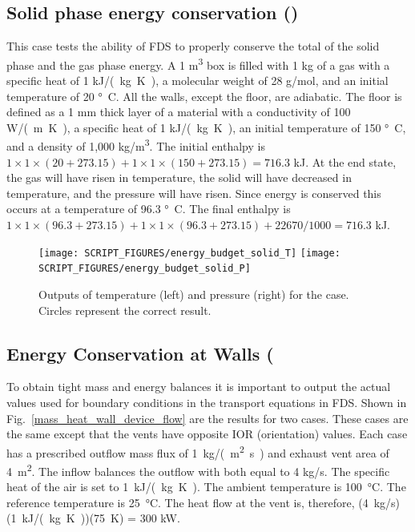 \documentclass[11pt]{book}
\begin{document}
\subsection{Solid phase energy conservation (\texorpdfstring{}{energy\_budget\_solid})}
\label{energy_budget_solid}

This case tests the ability of FDS to properly conserve the total of the solid phase and the gas phase energy.  A 1 \si{m^3} box is filled with 1 kg of a gas with a specific heat of 1 \si{kJ/(kg.K)}, a molecular weight of 28 g/mol, and an initial temperature of 20 \si{\degree C}.  All the walls, except the floor, are adiabatic.  The floor is defined as a 1 mm thick layer of a material with a conductivity of 100 \si{W/(m.K)},  a specific heat of 1 \si{kJ/(kg.K)}, an initial temperature of 150 \si{\degree C}, and a density of 1,000 \si{kg/m^3}.  The initial enthalpy is $1 \times 1 \times (20+273.15) + 1 \times 1 \times (150+273.15)  =  716.3$ kJ.  At the end state, the gas will have risen in temperature, the solid will have decreased in temperature, and the pressure will have risen.  Since energy is conserved this occurs at a temperature of 96.3 \si{\degree C}.  The final enthalpy is $1 \times 1 \times (96.3+273.15) + 1 \times 1 \times (96.3+273.15) + 22670 / 1000  =  716.3$ kJ.

\begin{figure}[ht]
\texttt{[image: SCRIPT\_FIGURES/energy\_budget\_solid\_T]}
\texttt{[image: SCRIPT\_FIGURES/energy\_budget\_solid\_P]}
\caption[The  test case]{\label{fig_solid_energy} Outputs of temperature (left) and pressure (right) for the  case.  Circles represent the correct result.}
\end{figure}



\subsection{Energy Conservation at Walls (\texorpdfstring{})}
\label{mass_heat_wall_device_test}
\label{mass_heat_wall_device_test_2}

To obtain tight mass and energy balances it is important to output the actual values used for boundary conditions in the transport equations in FDS. Shown in Fig.~\ref{mass_heat_wall_device_flow} are the results for two cases.  These cases are the same except that the vents have opposite {\ct IOR} (orientation) values.  Each case has a prescribed outflow mass flux of 1~\si{kg/(m^2.s)} and exhaust vent area of 4~\si{m^2}. The inflow balances the outflow with both equal to 4 \si{kg/s}.  The specific heat of the air is set to 1~\si{kJ/(kg.K)}.  The ambient temperature is 100~\si{\degreeCelsius}.  The reference temperature is 25~\si{\degreeCelsius}.  The heat flow at the vent is, therefore, (4~\si{kg/s})(1~\si{kJ/(kg.K)})(75~K) = 300 kW.
\end{document}
